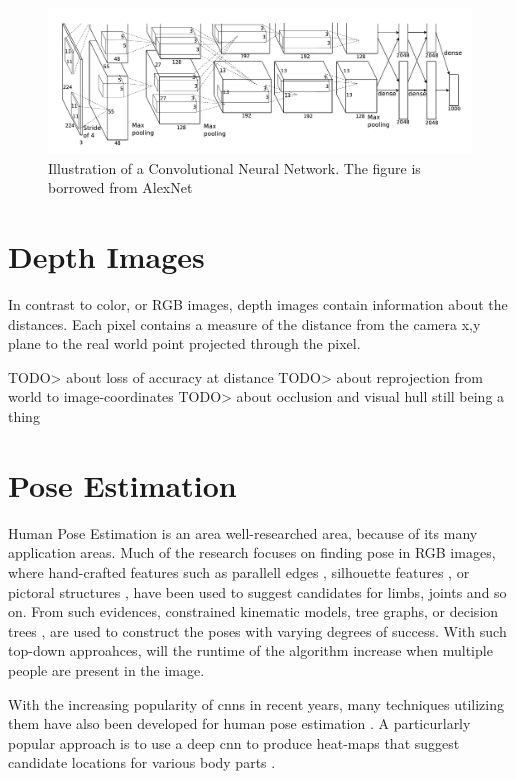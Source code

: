 \begin{figure}[h]
  \centering
  \includegraphics[width=\textwidth]{img/alexnet}
  \caption[AlexNet]{Illustration of a Convolutional Neural Network. The figure is borrowed from AlexNet~\cite{alexnet2012}}
  \label{fig:alexnet}
\end{figure}

\section{Depth Images}
In contrast to color, or RGB images, depth images contain information about the distances. Each pixel contains a measure of the distance from the camera x,y plane to the real world point projected through the pixel.

TODO> about loss of accuracy at distance
TODO> about reprojection from world to image-coordinates
TODO> about occlusion and visual hull still being a thing


\section{Pose Estimation}
Human Pose Estimation is an area well-researched area, because of its many application areas. Much of the research focuses on finding pose in RGB images, where hand-crafted features such as parallell edges \cite{ramanan2003,mori2002}, silhouette features \cite{grauman2003}, or pictoral structures \cite{fischler1973,felzenszwalb2005}, have been used to suggest candidates for limbs, joints and so on. From such evidences, constrained kinematic models, tree graphs, or decision trees \cite{shotton2013}, are used to construct the poses with varying degrees of success. With such top-down approahces, will the runtime of the algorithm increase when multiple people are present in the image.

With the increasing popularity of \gls{cnn}s in recent years, many techniques utilizing them have also been developed for human pose estimation \cite{tompson2014joint}. A particurlarly popular approach is to use a deep \gls{cnn} to produce heat-maps that suggest candidate locations for various body parts \cite{wei2016cpm,wang2016}.


